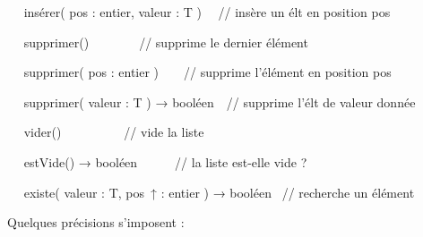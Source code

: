 {\sffamily
\ \  insérer( pos : entier, valeur : T ) \ \ //
insère un élt en position pos}

{\sffamily
\ \  supprimer()\ \ \ \ \ \ \ \ // supprime le
dernier élément}

{\sffamily
\ \  supprimer( pos : entier )\ \ \ \ //
supprime l'élément en position pos}

{\sffamily
\ \  supprimer( valeur : T ) → booléen\ \ //
supprime l'élt de valeur donnée}

{\sffamily
\ \  vider()\ \ \ \ \ \ \ \ \ \ // vide la
liste}

{\sffamily
\ \  estVide() → booléen\ \ \ \ \ \ // la liste
est-elle vide ?}

{\sffamily
\ \  existe( valeur : T, pos~↑ : entier ) →
booléen \ // recherche un élément}

{\sffamily
{} }

{
Quelques précisions s’imposent :}

